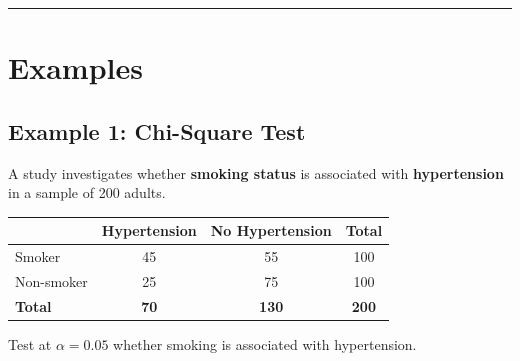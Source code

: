 \documentclass[
  12pt,
  letterpaper,
]{book}
\newcounter{none} %
\begin{document}
\begin{center}\rule{0.5\linewidth}{0.5pt}\end{center}


\chapter{Examples}\label{examples-4}

\section{Example 1: Chi-Square Test}\label{example-1-chi-square-test}

A study investigates whether \textbf{smoking status} is associated with
\textbf{hypertension} in a sample of 200 adults.

{\def\LTcaptype{none} %
\begin{longtable}[]{@{}lccc@{}}
\toprule\noalign{}
& Hypertension & No Hypertension & Total \\
\midrule\noalign{}
\endhead
\bottomrule\noalign{}
\endlastfoot
Smoker & 45 & 55 & 100 \\
Non-smoker & 25 & 75 & 100 \\
\textbf{Total} & \textbf{70} & \textbf{130} & \textbf{200} \\
\end{longtable}
}

Test at \(\alpha = 0.05\) whether smoking is associated with
hypertension.
\end{document}
